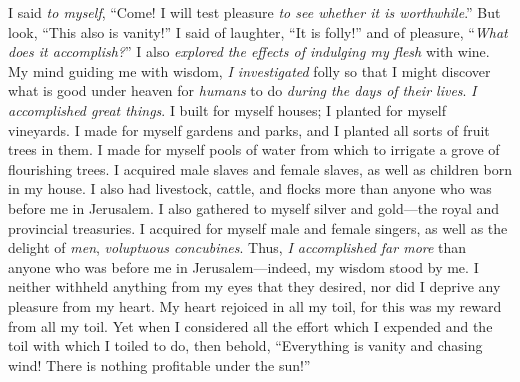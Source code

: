 \begin{biblechapter} %
 I said \textit{to myself}, “Come! I will test pleasure \textit{to see whether it is worthwhile}.” But look, “This also is vanity!”
\verse I said of laughter, “It is folly!” and of pleasure, “\textit{What does it accomplish?}”
\verse I also \textit{explored} \textit{the effects of indulging my flesh} with wine. My mind guiding me with wisdom, \textit{I investigated} folly so that I might discover what is good under heaven for \textit{humans} to do \textit{during the days of their lives}.
 \textit{I accomplished great things}. I built for myself houses; I planted for myself vineyards.
\verse I made for myself gardens and parks, and I planted all sorts of fruit trees in them.
\verse I made for myself pools of water from which to irrigate a grove of flourishing trees.
\verse I acquired male slaves and female slaves, as well as children born in my house. I also had livestock, cattle, and flocks more than anyone who was before me in Jerusalem.
\verse I also gathered to myself silver and gold—the royal and provincial treasuries. I acquired for myself male and female singers, as well as the delight of \textit{men}, \textit{voluptuous concubines}.
\verse Thus, \textit{I accomplished far more} than anyone who was before me in Jerusalem—indeed, my wisdom stood by me.
\verse I neither withheld anything from my eyes that they desired, nor did I deprive any pleasure from my heart. My heart rejoiced in all my toil, for this was my reward from all my toil.
\verse Yet when I considered all the effort which I expended and the toil with which I toiled to do, then behold, “Everything is vanity and chasing wind! There is nothing profitable under the sun!”

\end{biblechapter}
